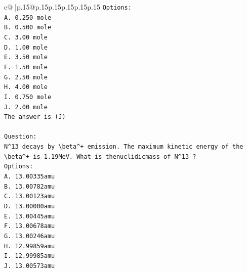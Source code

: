 \documentclass{article}
\begin{document}
{\begin{supertabular}{c@{$\;$}|p{.15\linewidth}@{}p{.15\linewidth}p{.15\linewidth}p{.15\linewidth}p{.15\linewidth}p{.15\linewidth}}
{{{\texttt{Options:} \\
\texttt{A. 0.250 mole} \\
\texttt{B. 0.500 mole} \\
\texttt{C. 3.00 mole} \\
\texttt{D. 1.00 mole} \\
\texttt{E. 3.50 mole} \\
\texttt{F. 1.50 mole} \\
\texttt{G. 2.50 mole} \\
\texttt{H. 4.00 mole} \\
\texttt{I. 0.750 mole} \\
\texttt{J. 2.00 mole} \\
\texttt{The answer is (J)} \\
\\ 
\texttt{Question:} \\
\texttt{N\^{}13 decays by \textbackslash{}beta\^{}+ emission. The maximum kinetic energy of the \textbackslash{}beta\^{}+ is 1.19MeV. What is thenuclidicmass of N\^{}13 ?} \\
\texttt{Options:} \\
\texttt{A. 13.00335amu} \\
\texttt{B. 13.00782amu} \\
\texttt{C. 13.00123amu} \\
\texttt{D. 13.00000amu} \\
\texttt{E. 13.00445amu} \\
\texttt{F. 13.00678amu} \\
\texttt{G. 13.00246amu} \\
\texttt{H. 12.99859amu} \\
\texttt{I. 12.99985amu} \\
\texttt{J. 13.00573amu} \\
            }
        }
    }
     \\ \\


\end{supertabular}}
\end{document}
